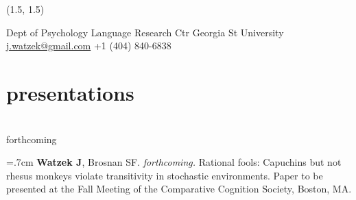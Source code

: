 \documentclass[]{friggeri-cv}
\begin{document}
\renewenvironment{aside}{%
  \let\oldsection\section
  \renewcommand{\section}[1]{
    \par\vspace{\baselineskip}{\Large\headingfont\color{headercolor} ##1}
  }
  \begin{textblock}{3.6}(1.5, 1.5)
  \begin{flushright}
  \obeycr
}{%
  \restorecr
  \end{flushright}
  \end{textblock}
  \let\section\oldsection
}


\begin{aside}
  \section{{\normalfont julia}watzek}
    Dept of Psychology
    Language Research Ctr
    Georgia St University
    ~
    \href{mailto:j.watzek@gmail.com}{j.watzek@gmail.com}
    +1 (404) 840-6838
\end{aside}


\section{presentations}



{\large{} ~\\ forthcoming}

\hangindent=.7cm \textbf{Watzek J}, Brosnan SF. \emph{forthcoming.} Rational fools: Capuchins but not rhesus monkeys violate transitivity in stochastic environments. Paper to be presented at the Fall Meeting of the Comparative Cognition Society, Boston, MA.
\end{document}
